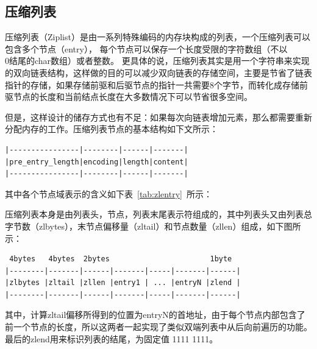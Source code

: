 \documentclass{zjutthesis}
\begin{document}
\subsection{压缩列表}
压缩列表（Ziplist）是由一系列特殊编码的内存块构成的列表，一个压缩列表可以包含多个节点（entry）， 每个节点可以保存一个长度受限的字符数组（不以\\0结尾的char数组）或者整数。
更具体的说，压缩列表其实是用一个字符串来实现的双向链表结构，这样做的目的可以减少双向链表的存储空间，主要是节省了链表指针的存储，如果存储前驱和后驱节点的指针一共需要8个字节，而转化成存储前驱节点的长度和当前结点长度在大多数情况下可以节省很多空间。

但是，这样设计的储存方式也有不足：如果每次向链表增加元素，那么都需要重新分配内存的工作。压缩列表节点的基本结构如下文所示：
\begin{verbatim}
|----------------|--------|------|-------|
|pre_entry_length|encoding|length|content|
|----------------|--------|------|-------|
\end{verbatim}
其中各个节点域表示的含义如下表~\ref{tab:zlentry}~所示：

\begin{table}[htbp]
\caption{压缩列表节点}\label{tab:zlentry}
\vspace{\baselineskip}
\end{table}

压缩列表本身是由列表头，节点，列表末尾表示符组成的，其中列表头又由列表总字节数（zlbytes），末节点偏移量（zltail）和节点数量（zllen）组成，如下图所示：
\begin{verbatim}
 4bytes   4bytes  2bytes                       1byte
|--------|-------|------|-------|-----|-------|------|
|zlbytes |zltail |zllen |entry1 | ... |entryN |zlend |
|--------|-------|------|-------|-----|-------|------|
\end{verbatim}
其中，计算zltail偏移所得到的位置为entryN的首地址，由于每个节点内部包含了前一个节点的长度，所以这两者一起实现了类似双端列表中从后向前遍历的功能。最后的zlend用来标识列表的结尾，为固定值 1111 1111。
\end{document}

